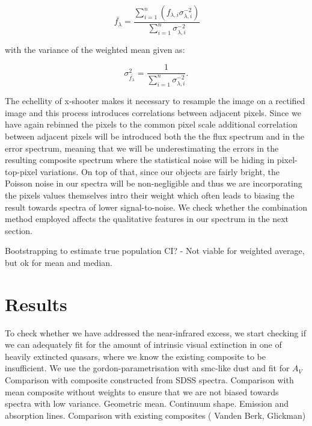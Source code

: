 \documentclass[iop]{emulateapj}
\begin{document}
\begin{equation}
\
\bar{f_{\lambda}} = \frac{ \sum_{i=1}^n \left( f_{\lambda, i} \sigma_{\lambda, i}^{-2} \right)}{\sum_{i=1}^n \sigma_{\lambda, i}^{-2}}
\end{equation}

 with the variance of the weighted mean given as: 
 
 \begin{equation}
 \sigma_{\bar{f_{\lambda}}}^2 = \frac{ 1 }{\sum_{i=1}^n \sigma_{\lambda, i}^{-2}}.
\end{equation}

The echellity of x-shooter makes it necessary to resample the image on a rectified image and this process introduces correlations between adjacent pixels. Since we have again rebinned the pixels to the common pixel scale additional correlation between adjacent pixels will be introduced both the the flux spectrum and in the error spectrum, meaning that we will be underestimating the errors in the resulting composite spectrum where the statistical noise will be hiding in pixel-top-pixel variations. On top of that, since our objects are fairly bright, the Poisson noise in our spectra will be non-negligible and thus we are incorporating the pixels values themselves intro their weight which often leads to biasing the result towards spectra of lower signal-to-noise. We check whether the combination method employed affects the qualitative features in our spectrum in the next section.

Bootstrapping to estimate true population CI? - Not viable for weighted average, but ok for mean and median. 




\section{Results}

To check whether we have addressed the near-infrared excess, we start checking if we can adequately fit for the amount of intrinsic visual extinction in one of heavily extincted quasars, where we know the existing composite to be insufficient. We use the gordon-parametrisation with smc-like dust and fit for $A_V$
Comparison with composite constructed from SDSS spectra. Comparison with mean composite without weights to ensure that we are not biased towards spectra with low variance. Geometric mean. 
Continuum shape. Emission and absorption lines. Comparison with existing composites ( Vanden Berk, Glickman)
\end{document}
